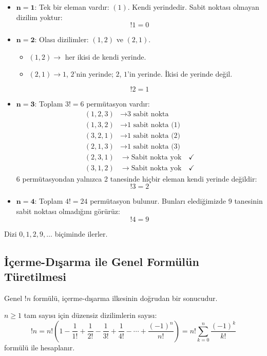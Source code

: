 \begin{itemize} \item $\mathbf{n = 1}$: Tek bir eleman vardır: $(1)$. Kendi
yerindedir. Sabit noktası olmayan dizilim yoktur: \[ !1 = 0 \] \item $\mathbf{n =
2}$: Olası dizilimler: $(1, 2)$ ve $(2, 1)$. \begin{itemize} \item $(1, 2) \to$ her
ikisi de kendi yerinde. \item $(2, 1) \to 1$, $2$'nin yerinde; $2$, $1$'in yerinde.
İkisi de yerinde değil. \end{itemize} \[ !2 = 1 \] \item $\mathbf{n = 3}$: Toplam
$3! = 6$ permütasyon vardır: \begin{align*} (1, 2, 3) &\to \text{3 sabit nokta}
\\ (1, 3, 2) &\to \text{1 sabit nokta (1)} \\ (3, 2, 1) &\to \text{1 sabit
nokta (2)} \\ (2, 1, 3) &\to \text{1 sabit nokta (3)} \\ (2, 3, 1) &\to
\text{Sabit nokta yok} \quad \checkmark \\ (3, 1, 2) &\to \text{Sabit nokta yok}
\quad \checkmark \end{align*} 6 permütasyondan yalnızca 2 tanesinde hiçbir eleman
kendi yerinde değildir: \[ !3 = 2 \] \item $\mathbf{n = 4}$: Toplam $4! = 24$
permütasyon bulunur. Bunları elediğimizde 9 tanesinin sabit noktası olmadığını
görürüz: \[ !4 = 9 \] \end{itemize} Dizi $0, 1, 2, 9, \dots$ biçiminde ilerler.

\subsection{İçerme-Dışarma ile Genel Formülün Türetilmesi}

Genel $!n$ formülü, içerme-dışarma ilkesinin doğrudan bir sonucudur.

\begin{theorem} $n \ge 1$ tam sayısı için düzensiz
dizilimlerin sayısı: \[ !n = n! \left( 1 - \frac{1}{1!} + \frac{1}{2!} -
\frac{1}{3!} + \frac{1}{4!} - \cdots + \frac{(-1)^n}{n!} \right) = n!
\sum_{k=0}^n \frac{(-1)^k}{k!} \] formülü ile hesaplanır. \end{theorem}

